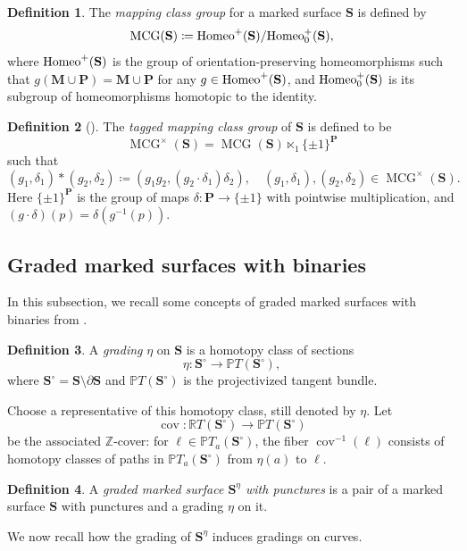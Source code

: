 \documentclass[11pt,a4paper,reqno]{amsart}%
\theoremstyle{plain}
\theoremstyle{definition}
\newtheorem{definition}[definition]{Definition}
\numberwithin{equation}{section}
\numberwithin{equation}{section}
\def\ZZ{\mathbb{Z}}
\def\surf{\mathbf{S}} %
\def\surfi{\surf^\circ}
\def\grad{\eta}
\newcommand{\MCG}{\operatorname{MCG}}
\newcommand{\gms}{\surf^\grad}
\def\surf{\mathbf{S}}                       %
\def\M{\mathbf{M}}
\renewcommand\P{\mathbf{P}} %
\begin{document}
\begin{definition}\label{defmcg}
	The \emph{mapping class group} for a  marked surface  $ \surf $ is defined by
	\[ \MCG(\surf) \coloneqq \text{\rm Homeo}^{+}(\surf)/\text{\rm Homeo}^{+}_{0}(\surf) ,\]
	where $ \text{\rm Homeo}^{+}(\surf) $ is the group of orientation-preserving homeomorphisms such that $ g(\M\cup \P)=\M\cup \P $ for any  $ g \in  \text{\rm Homeo}^{+}(\surf) $, and $ \text{\rm Homeo}^{+}_{0}(\surf) $ is its subgroup of homeomorphisms homotopic to the identity.
\end{definition}


 


 
\begin{definition}[{\cite[Section~3.1]{BQ}}]\label{tagmcg}
The \emph{tagged mapping class group} of $\surf$ is defined to be
\[
\MCG^\times(\surf)=\MCG(\surf)\ltimes_1 \{\pm1\}^{\P}
\]
such that
\[
(g_1,\delta_1)*(g_2,\delta_2)
\coloneqq(g_1g_2,(g_2\cdot\delta_1)\delta_2),\quad
(g_1,\delta_1),(g_2,\delta_2)\in\MCG^\times(\surf).
\]
Here $\{\pm1\}^{\P}$ is the group of maps $\delta:\P\to\{\pm1\}$ with pointwise multiplication, and $(g\cdot\delta)(p)=\delta(g^{-1}(p))$.
\end{definition}

\subsection{Graded marked surfaces with binaries}\label{sec:gms}
 In this subsection, we recall 
 some concepts of graded marked surfaces with binaries
 from \cite{QZZ,HKK,LP,IQZ}.
\begin{definition}
   A \emph{grading} $\grad$ on $\surf$ is a homotopy class of sections
\[
\grad:\surfi\to \mathbb{P}T(\surfi),
\]
where $\surfi=\surf\setminus\partial\surf$ and $\mathbb{P}T(\surfi)$ is the projectivized tangent bundle. 
\end{definition}
Choose a representative of this homotopy class, still denoted by $\grad$. Let
\[
\operatorname{cov}\colon \mathbb{R}T(\surfi) \longrightarrow \mathbb{P}T(\surfi)
\]
be the associated $\ZZ$-cover: for $\ell\in\mathbb{P}T_a(\surfi)$, the fiber
$\operatorname{cov}^{-1}(\ell)$ consists of homotopy classes of paths in
$\mathbb{P}T_a(\surfi)$ from $\grad(a)$ to $\ell$.

\begin{definition}
    A \emph{graded marked surface $\gms$ with punctures}  is a pair of a marked surface $\surf$ with punctures and a grading $\grad$ on it.
\end{definition}
We now recall how the grading of $\gms$ induces gradings on curves.
 
\end{document}
